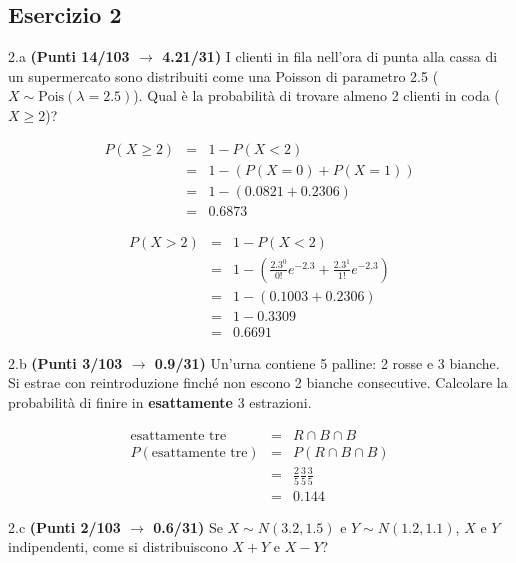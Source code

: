 \documentclass[
  11pt,
]{book}
\theoremstyle{mytheoremstyle}
\theoremstyle{mydefstyle}
\newenvironment{sol}
  {
  \begin{tcolorbox}[enhanced,breakable,arc=0.1mm,boxrule=1pt,colback=white,colframe=iblue,
  title=\bf \fontfamily{lmss}\selectfont \hspace{.5 cm} Soluzione,drop fuzzy shadow]

}{
\end{tcolorbox}
  }
\begin{document}
\subsection{Esercizio 2}\label{esercizio-2-20}

2.a \textbf{(Punti 14/103 \(\rightarrow\) 4.21/31)} I clienti in fila nell'ora di punta alla cassa di un supermercato sono distribuiti come una Poisson di parametro 2.5 (\(X\sim\text{Pois}(\lambda=2.5)\)). Qual è la probabilità di trovare almeno 2 clienti in coda (\(X\ge 2\))?

\begin{sol}
\begin{eqnarray*}
  P(X\ge 2) &=&  1-P(X<2)\\
  &=& 1-(P(X=0)+P(X=1))\\
  &=& 1-(0.0821+0.2306)\\
  &=& 0.6873
\end{eqnarray*}

\begin{eqnarray*}
   P( X > 2 ) &=& 1-P( X < 2 ) \\                 &=& 1-\left( \frac{ 2.3 ^{ 0 }}{ 0 !}e^{- 2.3 }+\frac{ 2.3 ^{ 1 }}{ 1 !}e^{- 2.3 } \right)\\                 &=& 1-( 0.1003+0.2306 )\\                 &=& 1- 0.3309 \\                 &=&   0.6691 
\end{eqnarray*}

\end{sol}

2.b \textbf{(Punti 3/103 \(\rightarrow\) 0.9/31)} Un'urna contiene 5 palline: 2 rosse e 3 bianche. Si estrae con reintroduzione finché non escono 2 bianche consecutive. Calcolare la probabilità di finire in \textbf{esattamente} 3 estrazioni.

\begin{sol}
\begin{eqnarray*}
  \text{esattamente tre} &=& R\cap B\cap B \\
  P(\text{esattamente tre}) &=& P(R\cap B\cap B)\\
  &=&\frac 25 \frac 35\frac 35\\
  &=& 0.144
\end{eqnarray*}

\end{sol}

2.c \textbf{(Punti 2/103 \(\rightarrow\) 0.6/31)} Se \(X\sim N(3.2,1.5)\) e \(Y\sim N(1.2,1.1)\), \(X\) e \(Y\) indipendenti, come si distribuiscono \(X+Y\) e \(X-Y\)?
\end{document}
